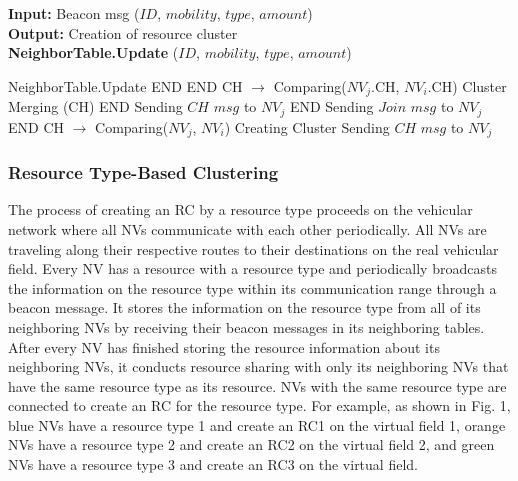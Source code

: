 \documentclass[sensors,article,accept,moreauthors,pdftex]{Definitions/mdpi}
\begin{document}
\begin{algorithm}[H]
    \caption{Resource cluster construction} \label{algo.creation}
    \textbf{Input: } Beacon msg ($ID$, $mobility$, $type$, $amount$)\\
    \textbf{Output: } Creation of resource cluster\\
    \textbf{NeighborTable.Update} ($ID$, $mobility$, $type$, $amount$)\\
    \begin{algorithmic}[1]
        \State NeighborTable.Update
            \State END
        \EndIf
                \State END
            \EndIf
            \State CH $\rightarrow$ Comparing($NV_{j}$.CH, $NV_{i}$.CH)
            \State Cluster Merging (CH)
            \State END
        \EndIf
            \State Sending $CH$ $msg$ to $NV_{j}$
            \State END
        \EndIf
            \State Sending $Join$ $msg$ to $NV_{j}$
            \State END
        \EndIf
        \State CH $\rightarrow$ Comparing($NV_{j}$, $NV_{i}$)
        \State Creating Cluster
        \State Sending $CH$ $msg$ to $NV_{j}$
    \end{algorithmic}
\end{algorithm}

\subsubsection{Resource Type-Based Clustering}
The process of creating an RC by a resource type proceeds on the vehicular network where all NVs communicate with each other periodically. All NVs are traveling along their respective routes to their destinations on the real vehicular field. Every NV has a resource with a resource type and periodically broadcasts the information on the resource type within its communication range through a beacon message. It stores the information on the resource type from all of its neighboring NVs by receiving their beacon messages in its neighboring tables. 
After every NV has finished storing the resource information about its neighboring NVs, it conducts resource sharing with only its neighboring NVs that have the same resource type as its resource.
NVs with the same resource type are connected to create an RC for the resource type. For example, as shown in Fig. 1, blue NVs have a resource type 1 and create an RC1 on the virtual field 1, orange NVs have a resource type 2 and create an RC2 on the virtual field 2, and green NVs have a resource type 3 and create an RC3 on the virtual field.
\end{document}
